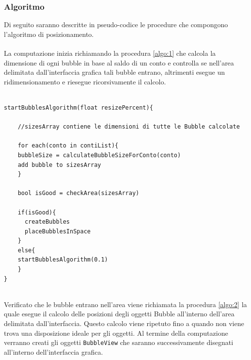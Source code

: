 \subsubsection{Algoritmo}
Di seguito saranno descritte in pseudo-codice le procedure che compongono l'algoritmo di posizionamento.
\\\\
La computazione inizia richiamando la procedura \ref{algo:1} che calcola la dimensione di ogni bubble in base al saldo di un conto e controlla se nell'area delimitata dall'interfaccia grafica tali bubble entrano, altrimenti esegue un ridimensionamento e riesegue ricorsivamente il calcolo.
\begin{lstlisting}[label=algo:1,caption=startBubblesAlgorithm,breaklines=true]

startBubblesAlgorithm(float resizePercent){
    
    //sizesArray contiene le dimensioni di tutte le Bubble calcolate
    
    for each(conto in contiList){
	bubbleSize = calculateBubbleSizeForConto(conto)
	add bubble to sizesArray
    }
  
    bool isGood = checkArea(sizesArray)
    
    if(isGood){
      createBubbles
      placeBubblesInSpace
    }
    else{
	startBubblesAlgorithm(0.1)
    }
}


\end{lstlisting}

Verificato che le bubble entrano nell'area viene richiamata la procedura \ref{algo:2} la quale esegue il calcolo delle posizioni degli oggetti Bubble all'interno dell'area delimitata dall'interfaccia. Questo calcolo viene ripetuto fino a quando non viene trova una disposizione ideale per gli oggetti. Al termine della computazione verranno creati gli oggetti \texttt{BubbleView} che saranno successivamente disegnati all'interno dell'interfaccia grafica.

